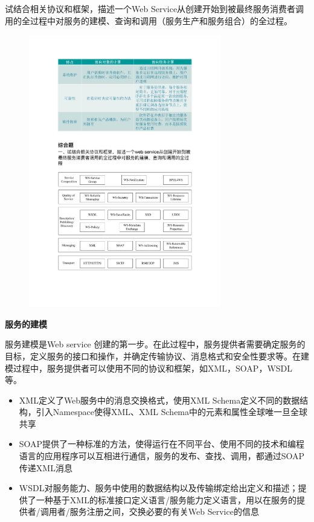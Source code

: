 \begin{problem}
试结合相关协议和框架，描述一个Web Service从创建开始到被最终服务消费者调用的全过程中对服务的建模、查询和调用（服务生产和服务组合）的全过程。
\end{problem}

\begin{solution}
\begin{figure}[H]
    \vspace{-0.5em}
	\centering
	\includegraphics[width=0.75\textwidth]{Web Service过程.pdf}
    \vspace{-1em}
\end{figure}

\textbf{服务的建模}\par
服务建模是Web service 创建的第一步。在此过程中，服务提供者需要确定服务的目标，定义服务的接口和操作，并确定传输协议、消息格式和安全性要求等。在建模过程中，服务提供者可以使用不同的协议和框架，如XML，SOAP，WSDL等。
\begin{itemize}
    \item XML定义了Web服务中的消息交换格式，使用XML Schema定义不同的数据结构，引入Namespace使得XML、XML Schema中的元素和属性全球唯一旦全球共享
    \item SOAP提供了一种标准的方法，使得运行在不同平台、使用不同的技术和编程语言的应用程序可以互相进行通信，服务的发布、查找、调用，都通过SOAP传递XML消息
    \item WSDL对服务能力、服务中使用的数据结构以及传输绑定给出定义和描述；提供了一种基于XML的标准接口定义语言/服务能力定义语言，用以在服务的提供者/调用者/服务注册之间，交换必要的有关Web Service的信息
\end{itemize}


\end{solution}
